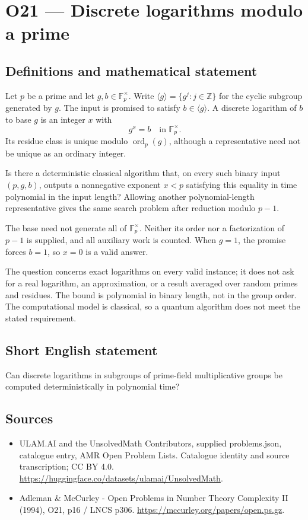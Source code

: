 \documentclass[11pt,a4paper]{article}
\begin{document}
\section*{O21 — Discrete logarithms modulo a prime}\label{statement}

\subsection{Definitions and mathematical statement}
Let $p$ be a prime and let $g,b\in\mathbb F_p^\times$. Write $\langle g\rangle=\{g^j:j\in\mathbb Z\}$ for the cyclic subgroup generated by $g$. The input is promised to satisfy $b\in\langle g\rangle$. A discrete logarithm of $b$ to base $g$ is an integer $x$ with
\[
g^x=b\quad\text{in }\mathbb F_p^\times.
\]
Its residue class is unique modulo $\operatorname{ord}_p(g)$, although a representative need not be unique as an ordinary integer.

Is there a deterministic classical algorithm that, on every such binary input $(p,g,b)$, outputs a nonnegative exponent $x<p$ satisfying this equality in time polynomial in the input length? Allowing another polynomial-length representative gives the same search problem after reduction modulo $p-1$.

The base need not generate all of $\mathbb F_p^\times$. Neither its order nor a factorization of $p-1$ is supplied, and all auxiliary work is counted. When $g=1$, the promise forces $b=1$, so $x=0$ is a valid answer.

The question concerns exact logarithms on every valid instance; it does not ask for a real logarithm, an approximation, or a result averaged over random primes and residues. The bound is polynomial in binary length, not in the group order. The computational model is classical, so a quantum algorithm does not meet the stated requirement.
\subsection{Short English statement}
Can discrete logarithms in subgroups of prime-field multiplicative groups be computed deterministically in polynomial time?
\subsection{Sources}
\begin{itemize}
\item[S1] ULAM.AI and the UnsolvedMath Contributors, supplied problems.json, catalogue entry, AMR Open Problem Lists. Catalogue identity and source transcription; CC BY 4.0.
\url{https://huggingface.co/datasets/ulamai/UnsolvedMath}.
\item[S2] Adleman \& McCurley - Open Problems in Number Theory Complexity II (1994), O21, p16 / LNCS p306. 
\url{https://mccurley.org/papers/open.ps.gz}.
\end{itemize}
\end{document}
